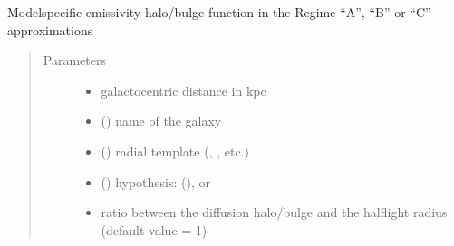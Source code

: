 \documentclass[letterpaper,10pt,english]{sphinxmanual}
\begin{document}

\begin{fulllineitems}
\label{\detokenize{diffsph.profiles:diffsph.profiles.massmodels.Hem}}
\sphinxAtStartPar
Model\sphinxhyphen{}specific emissivity halo/bulge function in the Regime “A”, “B” or “C” approximations
\begin{quote}\begin{description}
\item[{Parameters}] \leavevmode\begin{itemize}
\item {} 
\sphinxAtStartPar
{} \textendash{} galactocentric distance in kpc

\item {} 
\sphinxAtStartPar
{} () \textendash{} name of the galaxy

\item {} 
\sphinxAtStartPar
{} () \textendash{} radial template (, , etc.)

\item {} 
\sphinxAtStartPar
{} () \textendash{} hypothesis:  (),  or 

\item {} 
\sphinxAtStartPar
{} \textendash{} ratio between the diffusion halo/bulge and the half\sphinxhyphen{}light radius (default value = 1)


\end{itemize}
\end{description}
\end{quote}
\end{fulllineitems}
\end{document}
